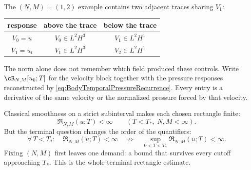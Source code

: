 The \((N,M)=(1,2)\) example contains two adjacent traces sharing \(V_1\):
\begin{center}
\captionsetup{hypcap=false}
\label{tab:FirstAdjacentRectangle}
\renewcommand{\arraystretch}{1.3}
\begin{tabular}{@{}c c c@{}}
\toprule
response & above the trace & below the trace \\
\midrule
\(V_0=u\) & \(V_0\in L^2H^3\) & \(V_1\in L^2H^1\) \\
\(V_1=u_t\) & \(V_1\in L^2H^3\) & \(V_2\in L^2H^1\) \\
\bottomrule
\end{tabular}
\end{center}

The norm alone does not remember which field produced these controls.  Write
\(\cR_{N,M}[u_0;T]\) for the velocity block together with the pressure
responses reconstructed by \eqref{eq:BodyTemporalPressureRecurrence}.  Every
entry is a derivative of the same velocity or the normalized pressure forced
by that velocity.

Classical smoothness on a strict subinterval makes each chosen rectangle
finite:
\begin{equation}\label{eq:StrictSubintervalRectangleBound}
  \mathfrak R_{N,M}(u;T)<\infty
  \qquad(T<T_*,\;N,M<\infty).
\end{equation}
But the terminal question changes the order of the quantifiers:
\[
  \forall\,T<T_*:\quad \mathfrak R_{N,M}(u;T)<\infty
  \quad\not\Longrightarrow\quad
  \sup_{0<T<T_*}\mathfrak R_{N,M}(u;T)<\infty.
\]
Fixing \((N,M)\) first leaves one demand: a bound that survives every cutoff
approaching \(T_*\).  This is the whole-terminal rectangle estimate.

